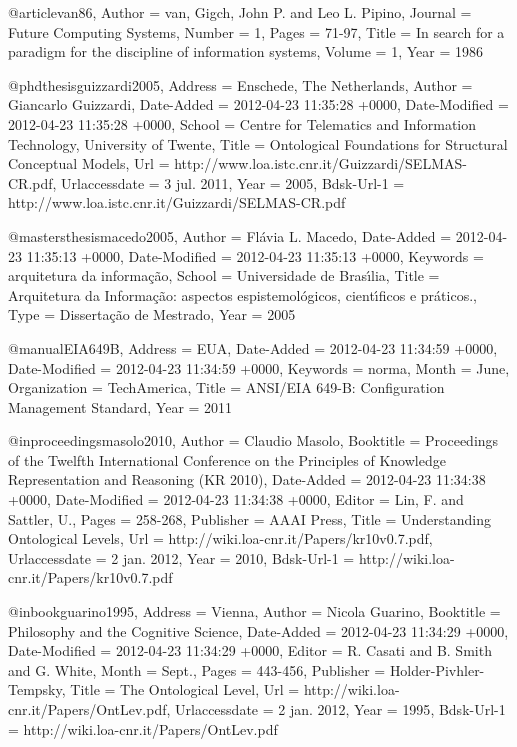 @article{van86,
	Author = {{van}, Gigch, John P. and Leo L. Pipino},
	Journal = {Future Computing Systems},
	Number = {1},
	Pages = {71-97},
	Title = {In search for a paradigm for the discipline of information systems},
	Volume = {1},
	Year = {1986}}

@phdthesis{guizzardi2005,
	Address = {Enschede, The Netherlands},
	Author = {Giancarlo Guizzardi},
	Date-Added = {2012-04-23 11:35:28 +0000},
	Date-Modified = {2012-04-23 11:35:28 +0000},
	School = {Centre for Telematics and Information Technology, University of Twente},
	Title = {Ontological Foundations for Structural Conceptual Models},
	Url = {http://www.loa.istc.cnr.it/Guizzardi/SELMAS-CR.pdf},
	Urlaccessdate = {3 jul. 2011},
	Year = {2005},
	Bdsk-Url-1 = {http://www.loa.istc.cnr.it/Guizzardi/SELMAS-CR.pdf}}

@mastersthesis{macedo2005,
	Author = {Fl{\'a}via L. Macedo},
	Date-Added = {2012-04-23 11:35:13 +0000},
	Date-Modified = {2012-04-23 11:35:13 +0000},
	Keywords = {arquitetura da informa{\c c}{\~a}o},
	School = {Universidade de Bras{\'\i}lia},
	Title = {Arquitetura da Informa{\c c}{\~a}o: aspectos espistemol{\'o}gicos, cient{\'\i}ficos e pr{\'a}ticos.},
	Type = {Disserta{\c c}{\~a}o de Mestrado},
	Year = {2005}}

@manual{EIA649B,
	Address = {EUA},
	Date-Added = {2012-04-23 11:34:59 +0000},
	Date-Modified = {2012-04-23 11:34:59 +0000},
	Keywords = {norma},
	Month = {June},
	Organization = {TechAmerica},
	Title = {ANSI/EIA 649-B: Configuration Management Standard},
	Year = {2011}}

@inproceedings{masolo2010,
	Author = {Claudio Masolo},
	Booktitle = {Proceedings of the Twelfth International Conference on the Principles of Knowledge Representation and Reasoning (KR 2010)},
	Date-Added = {2012-04-23 11:34:38 +0000},
	Date-Modified = {2012-04-23 11:34:38 +0000},
	Editor = {Lin, F. and Sattler, U.},
	Pages = {258-268},
	Publisher = {AAAI Press},
	Title = {Understanding Ontological Levels},
	Url = {http://wiki.loa-cnr.it/Papers/kr10v0.7.pdf},
	Urlaccessdate = {2 jan. 2012},
	Year = {2010},
	Bdsk-Url-1 = {http://wiki.loa-cnr.it/Papers/kr10v0.7.pdf}}

@inbook{guarino1995,
	Address = {Vienna},
	Author = {Nicola Guarino},
	Booktitle = {Philosophy and the Cognitive Science},
	Date-Added = {2012-04-23 11:34:29 +0000},
	Date-Modified = {2012-04-23 11:34:29 +0000},
	Editor = {R. Casati and B. Smith and G. White},
	Month = {Sept.},
	Pages = {443-456},
	Publisher = {Holder-Pivhler-Tempsky},
	Title = {The Ontological Level},
	Url = {http://wiki.loa-cnr.it/Papers/OntLev.pdf},
	Urlaccessdate = {2 jan. 2012},
	Year = {1995},
	Bdsk-Url-1 = {http://wiki.loa-cnr.it/Papers/OntLev.pdf}}


